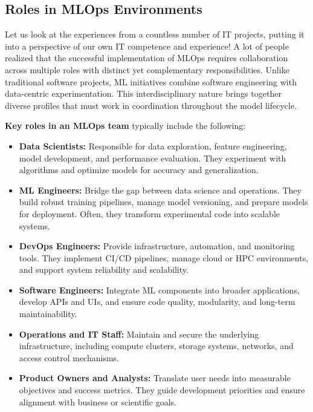 \subsection{Roles in MLOps Environments}

Let us look at the experiences from a countless number of IT projects, putting it into a perspective of our own IT competence and experience! A lot of people realized that the successful implementation of MLOps requires collaboration across multiple roles with distinct yet complementary responsibilities. Unlike traditional software projects, ML initiatives combine software engineering with data-centric experimentation. This interdisciplinary nature brings together diverse profiles that must work in coordination throughout the model lifecycle.


\noindent
\textbf{Key roles in an MLOps team} typically include the following:

\begin{itemize}
	\item \textbf{Data Scientists:} 
	Responsible for data exploration, feature engineering, model development, and performance evaluation. They experiment with algorithms and optimize models for accuracy and generalization.
	
	\item \textbf{ML Engineers:} 
	Bridge the gap between data science and operations. They build robust training pipelines, manage model versioning, and prepare models for deployment. Often, they transform experimental code into scalable systems.
	
	\item \textbf{DevOps Engineers:} 
	Provide infrastructure, automation, and monitoring tools. They implement CI/CD pipelines, manage cloud or HPC environments, and support system reliability and scalability.
	
	\item \textbf{Software Engineers:} 
	Integrate ML components into broader applications, develop APIs and UIs, and ensure code quality, modularity, and long-term maintainability.
	
	\item \textbf{Operations and IT Staff:} 
	Maintain and secure the underlying infrastructure, including compute clusters, storage systems, networks, and access control mechanisms.

	\item \textbf{Product Owners and Analysts:} 
	Translate user needs into measurable objectives and success metrics. They guide development priorities and ensure alignment with business or scientific goals.
\end{itemize}

